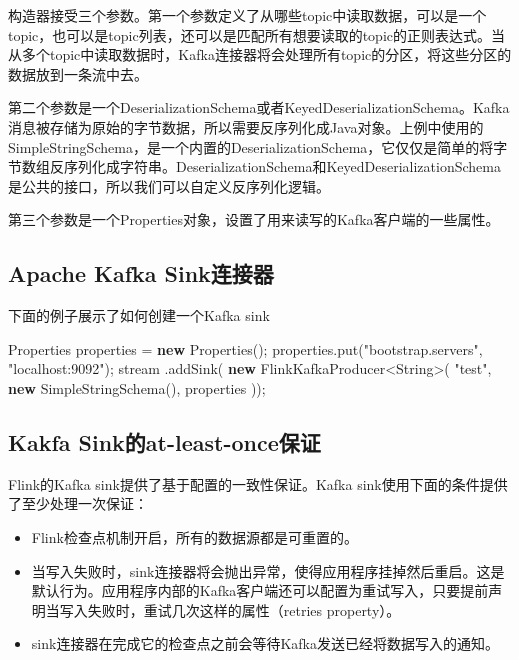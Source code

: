 \documentclass[cn,11pt,chinese]{elegantbook}
\newenvironment{Shaded}{}{}
\newcommand{\BuiltInTok}[1]{#1}
\newcommand{\FunctionTok}[1]{\textcolor[rgb]{0.02,0.16,0.49}{#1}}
\newcommand{\KeywordTok}[1]{\textcolor[rgb]{0.00,0.44,0.13}{\textbf{#1}}}
\newcommand{\NormalTok}[1]{#1}
\newcommand{\StringTok}[1]{\textcolor[rgb]{0.25,0.44,0.63}{#1}}
\providecommand{\tightlist}{%
  \setlength{\itemsep}{0pt}\setlength{\parskip}{0pt}}
\begin{document}
构造器接受三个参数。第一个参数定义了从哪些topic中读取数据，可以是一个topic，也可以是topic列表，还可以是匹配所有想要读取的topic的正则表达式。当从多个topic中读取数据时，Kafka连接器将会处理所有topic的分区，将这些分区的数据放到一条流中去。

第二个参数是一个DeserializationSchema或者KeyedDeserializationSchema。Kafka消息被存储为原始的字节数据，所以需要反序列化成Java对象。上例中使用的SimpleStringSchema，是一个内置的DeserializationSchema，它仅仅是简单的将字节数组反序列化成字符串。DeserializationSchema和KeyedDeserializationSchema是公共的接口，所以我们可以自定义反序列化逻辑。

第三个参数是一个Properties对象，设置了用来读写的Kafka客户端的一些属性。

\hypertarget{apache-kafka-sinkux8fdeux63a5ux5668}{%
\subsection{Apache Kafka
Sink连接器}\label{apache-kafka-sinkux8fdeux63a5ux5668}}

下面的例子展示了如何创建一个Kafka sink

\begin{Shaded}
\begin{Highlighting}[]
\BuiltInTok{Properties}\NormalTok{ properties = }\KeywordTok{new} \BuiltInTok{Properties}\NormalTok{();}
\NormalTok{properties.}\FunctionTok{put}\NormalTok{(}\StringTok{"bootstrap.servers"}\NormalTok{, }\StringTok{"localhost:9092"}\NormalTok{);}
\NormalTok{stream}
\NormalTok{    .}\FunctionTok{addSink}\NormalTok{(}
        \KeywordTok{new}\NormalTok{ FlinkKafkaProducer\textless{}}\BuiltInTok{String}\NormalTok{\textgreater{}(}
            \StringTok{"test"}\NormalTok{,}
            \KeywordTok{new} \FunctionTok{SimpleStringSchema}\NormalTok{(),}
\NormalTok{            properties}
\NormalTok{    ));}
\end{Highlighting}
\end{Shaded}

\hypertarget{kakfa-sinkux7684at-least-onceux4fddux8bc1}{%
\subsection{Kakfa
Sink的at-least-once保证}\label{kakfa-sinkux7684at-least-onceux4fddux8bc1}}

Flink的Kafka sink提供了基于配置的一致性保证。Kafka
sink使用下面的条件提供了至少处理一次保证：

\begin{itemize}
\tightlist
\item
  Flink检查点机制开启，所有的数据源都是可重置的。
\item
  当写入失败时，sink连接器将会抛出异常，使得应用程序挂掉然后重启。这是默认行为。应用程序内部的Kafka客户端还可以配置为重试写入，只要提前声明当写入失败时，重试几次这样的属性（retries
  property）。
\item
  sink连接器在完成它的检查点之前会等待Kafka发送已经将数据写入的通知。
\end{itemize}
\end{document}
